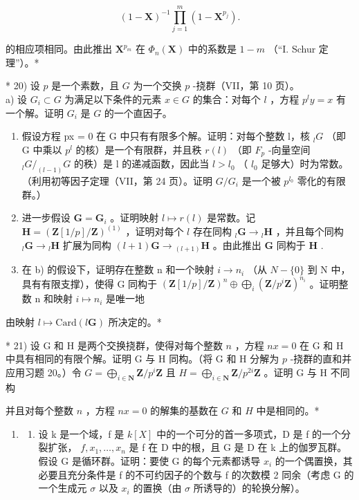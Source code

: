 \[
(1 - \mathbf {X}) ^ {- 1} \prod_ {j = 1} ^ {m} (1 - \mathbf {X} ^ {p _ {j}}).
\]

的相应项相同。由此推出 \(\mathbf{X}^{p_m}\) 在 \(\Phi_n(\mathbf{X})\) 中的系数是 \(1 - m\) （“I. Schur 定理”）。*

* 20) 设 \(p\) 是一个素数，且 \(G\) 为一个交换 \(p\) -挠群（VII，第 10 页）。\\
a) 设 \(G_i \subset G\) 为满足以下条件的元素 \(x \in G\) 的集合：对每个 \(l\) ，方程 \(p^{l} y = x\) 有一个解。证明 \(G_i\) 是 \(G\) 的一个直因子。

\begin{enumerate}
\def\labelenumi{\alph{enumi})}
\setcounter{enumi}{1}
\item
  假设方程 px = 0 在 G 中只有有限多个解。证明：对每个整数 l，核 \(_{l}G\) （即 G 中乘以 \(p^{l}\) 的核）是一个有限群，并且秩 \(r(l)\) （即 \(F_{p}\) -向量空间 \(_{l}G/_{(l-1)}G\) 的秩）是 l 的递减函数，因此当 \(l > l_{0}\) （ \(l_{0}\) 足够大）时为常数。（利用初等因子定理（VII，第 24 页）。证明 \(G/G_{i}\) 是一个被 \(p^{l_{0}}\) 零化的有限群。）
\item
  进一步假设 \(\mathbf{G} = \mathbf{G}_i\) 。证明映射 \(l \mapsto r(l)\) 是常数。记 \(\mathbf{H} = (\mathbf{Z}[1/p]/\mathbf{Z})^{(1)}\) ，证明对每个 \(l\) 存在同构 \(_l\mathbf{G} \to {}_l\mathbf{H}\) ，并且每个同构 \(_l\mathbf{G} \to {}_l\mathbf{H}\) 扩展为同构 \((l+1)\mathbf{G} \to {}_{(l+1)}\mathbf{H}\) 。由此推出 \(\mathbf{G}\) 同构于 \(\mathbf{H}\) .
\item
  在 b) 的假设下，证明存在整数 n 和一个映射 \(i \to n_i\) （从 \(N - \{0\}\) 到 N 中，具有有限支撑），使得 G 同构于 \((\mathbf{Z}[1/p]/\mathbf{Z})^n \oplus \bigoplus_{i} (\mathbf{Z}/p^i \mathbf{Z})^{n_i}\) 。证明整数 n 和映射 \(i \mapsto n_i\) 是唯一地
\end{enumerate}

由映射 \(l \mapsto \text{Card}(l\mathbf{G})\) 所决定的。*

* 21) 设 G 和 H 是两个交换挠群，使得对每个整数 \(n\) ，方程 \(nx = 0\) 在 G 和 H 中具有相同的有限个解。证明 G 与 H 同构。（将 G 和 H 分解为 \(p\) -挠群的直和并应用习题 20。）令 \(G = \bigoplus_{i \in \mathbf{N}} \mathbf{Z} / p^i\mathbf{Z}\) 且 \(H = \bigoplus_{i \in \mathbf{N}} \mathbf{Z} / p^{2i}\mathbf{Z}\) 。证明 G 与 H 不同构

并且对每个整数 \(n\) ，方程 \(nx = 0\) 的解集的基数在 \(G\) 和 \(H\) 中是相同的。*

\begin{enumerate}
\def\labelenumi{\arabic{enumi})}
\setcounter{enumi}{21}
\tightlist
\item
  \begin{enumerate}
  \def\labelenumii{\alph{enumii})}
  \tightlist
  \item
    设 k 是一个域，f 是 \(k[X]\) 中的一个可分的首一多项式，D 是 f 的一个分裂扩张， \(f, x_{1}, \ldots, x_{n}\) 是 f 在 D 中的根，且 G 是 D 在 k 上的伽罗瓦群。假设 G 是循环群。证明：要使 G 的每个元素都诱导 \(x_{i}\) 的一个偶置换，其必要且充分条件是 f 的不可约因子的个数与 f 的次数模 2 同余（考虑 G 的一个生成元 \(\sigma\) 以及 \(x_{i}\) 的置换（由 \(\sigma\) 所诱导的）的轮换分解）。
  \end{enumerate}
\end{enumerate}

